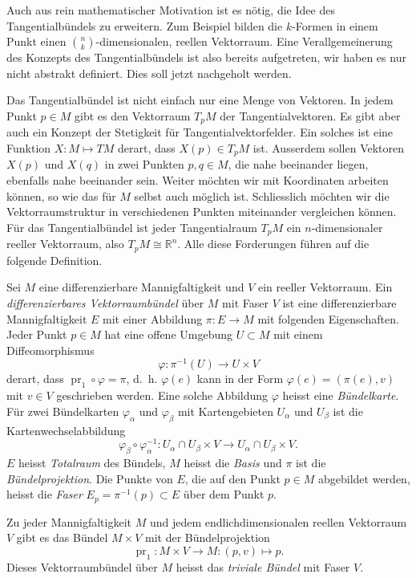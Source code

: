 Auch aus rein mathematischer Motivation ist es nötig, die Idee des
Tangentialbündels zu erweitern.
Zum Beispiel bilden die $k$-Formen in einem Punkt einen
$\binom{n}{k}$-dimensionalen, reellen Vektorraum.
Eine Verallgemeinerung des Konzepts des Tangentialbündels ist also
bereits aufgetreten, wir haben es nur nicht abstrakt definiert.
Dies soll jetzt nachgeholt werden.

Das Tangentialbündel ist nicht einfach nur eine Menge von Vektoren.
In jedem Punkt $p\in M$ gibt es den Vektorraum $T_pM$ der Tangentialvektoren.
Es gibt aber auch ein Konzept der Stetigkeit für Tangentialvektorfelder.
Ein solches ist eine Funktion $X\colon M\mapsto TM$ derart, dass 
$X(p)\in T_pM$ ist.
Ausserdem sollen Vektoren $X(p)$ und $X(q)$ in zwei Punkten $p,q\in M$,
die nahe beeinander liegen, ebenfalls nahe beeinander sein.
Weiter möchten wir mit Koordinaten arbeiten können, so wie das für $M$
selbst auch möglich ist.
Schliesslich möchten wir die Vektorraumstruktur in verschiedenen
Punkten miteinander vergleichen können.
Für das Tangentialbündel ist jeder Tangentialraum $T_pM$ ein
$n$-dimensionaler reeller Vektorraum, also $T_pM \cong \mathbb{R}^n$.
Alle diese Forderungen führen auf die folgende Definition.

\begin{definition}[Vektorraumbündel]
Sei $M$ eine differenzierbare Mannigfaltigkeit und $V$ ein reeller
Vektorraum.
Ein \emph{differenzierbares Vektorraumbündel} über $M$ mit Faser $V$
ist eine differenzierbare Mannigfaltigkeit $E$ mit einer Abbildung
$\pi\colon E\to M$ mit folgenden Eigenschaften.
Jeder Punkt $p\in M$ hat eine offene Umgebung $U\subset M$ mit einem
Diffeomorphismus
\[
\varphi\colon \pi^{-1}(U) \to U \times V
\]
derart, dass $\operatorname{pr}_1\circ\varphi =\pi$, d.~h.
$\varphi(e)$ kann in der Form $\varphi(e) = (\pi(e), v)$ mit $v\in V$
geschrieben werden.
Eine solche Abbildung $\varphi$ heisst eine \emph{Bündelkarte}.
Für zwei Bündelkarten $\varphi_\alpha$ und $\varphi_\beta$ mit
Kartengebieten $U_\alpha$ und $U_\beta$ ist die Kartenwechselabbildung
\[
\varphi_\beta
\circ
\varphi_\alpha^{-1}
\colon
U_\alpha\cap U_\beta \times V
\to
U_\alpha\cap U_\beta \times V
.
\]
$E$ heisst \emph{Totalraum} des Bündels, $M$ heisst die \emph{Basis}
und $\pi$ ist die \emph{Bündelprojektion}.
Die Punkte von $E$, die auf den Punkt $p\in M$ abgebildet werden,
heisst die \emph{Faser} $E_p=\pi^{-1}(p)\subset E$ über dem Punkt $p$.
\end{definition}

\begin{beispiel}
Zu jeder Mannigfaltigkeit $M$ und jedem endlichdimensionalen
reellen Vektorraum $V$ gibt es das Bündel $M\times V$ mit
der Bündelprojektion
\[
\operatorname{pr}_1
\colon
M\times V \to M
:
(p,v) \mapsto p.
\]
Dieses Vektorraumbündel über $M$ heisst das \emph{triviale Bündel}
mit Faser $V$.
\end{beispiel}

